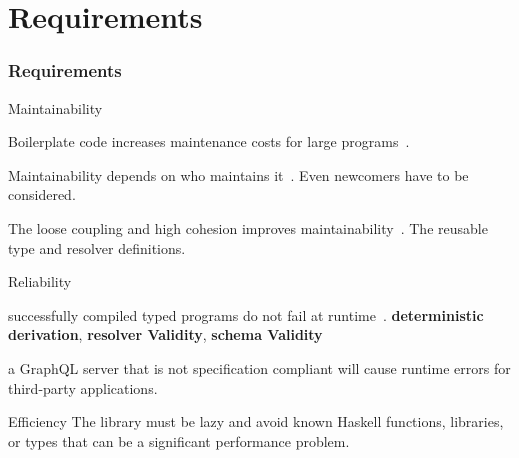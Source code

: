 \section{Requirements}

\begin{frame}[allowframebreaks]\frametitle{Requirements}  

\begin{block}{Maintainability}



\begin{itemize}

     Boilerplate code increases maintenance costs for large programs~\cite{scrap-your-boilerplate}.

     Maintainability depends on who maintains it~\cite{contr-reduce-maintainability}. Even newcomers have to be considered.

     The loose coupling and high cohesion improves maintainability~\cite{arc-modularity}. The reusable type and resolver definitions. 
    
\end{itemize}
\end{block}

\begin{block}{Reliability}

\begin{itemize}
     successfully compiled typed programs do not fail at runtime~\cite{milner-well-typed,wadler-well-typed}.  \textbf{deterministic derivation}, \textbf{resolver Validity}, \textbf{schema Validity}
    
     a GraphQL server that is not specification compliant will cause runtime errors for third-party applications.
\end{itemize}

\end{block}

\begin{block}{Efficiency}
The library must be lazy and avoid known Haskell functions, libraries, or types that can be a significant performance problem.
\end{block}

\end{frame}